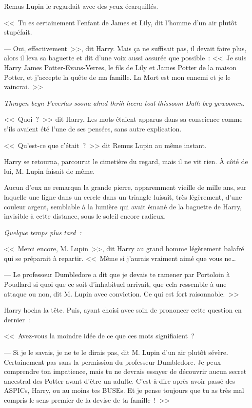Remus Lupin le regardait avec des yeux écarquillés.

<<~Tu es certainement l'enfant de James et Lily, dit l'homme d'un air plutôt stupéfait.

--- Oui, effectivement~>>, dit Harry. Mais ça ne suffisait pas, il devait faire plus, alors il leva sa baguette et dit d'une voix aussi assurée que possible~: <<~Je suis Harry James Potter-Evans-Verres, le fils de Lily et James Potter de la maison Potter, et j'accepte la quête de ma famille. La Mort est mon ennemi et je le vaincrai.~>>

\emph{Thrayen beyn Peverlas soona ahnd thrih heera toal thissoom Dath bey yewoonen.}

<<~Quoi~?~>> dit Harry. Les mots étaient apparus dans sa conscience comme s'ils avaient été l'une de ses pensées, sans autre explication.

<<~Qu'est-ce que c'était~?~>> dit Remus Lupin au même instant.

Harry se retourna, parcourut le cimetière du regard, mais il ne vit rien. À côté de lui, M. Lupin faisait de même.

Aucun d'eux ne remarqua la grande pierre, apparemment vieille de mille ans, sur laquelle une ligne dans un cercle dans un triangle luisait, très légèrement, d'une couleur argent, semblable à la lumière qui avait émané de la baguette de Harry, invisible à cette distance, sous le soleil encore radieux.

\later

\emph{Quelque temps plus tard~:}

<<~Merci encore, M. Lupin~>>, dit Harry au grand homme légèrement balafré qui se préparait à repartir. <<~Même si j'aurais vraiment aimé que vous ne…

--- Le professeur Dumbledore a dit que je devais te ramener par Portoloin à Poudlard si quoi que ce soit d'inhabituel arrivait, que cela ressemble à une attaque ou non, dit M. Lupin avec conviction. Ce qui est fort raisonnable.~>>

Harry hocha la tête. Puis, ayant choisi avec soin de prononcer cette question en dernier~:

<<~Avez-vous la moindre idée de ce que ces mots signifiaient~?

--- Si je le savais, je ne te le dirais pas, dit M. Lupin d'un air plutôt sévère. Certainement pas sans la permission du professeur Dumbledore. Je peux comprendre ton impatience, mais tu ne devrais essayer de découvrir aucun secret ancestral des Potter avant d'être un adulte. C'est-à-dire après avoir passé des ASPICs, Harry, ou au moins tes BUSEs. Et je pense toujours que tu as très mal compris le sens premier de la devise de ta famille~!~>>

